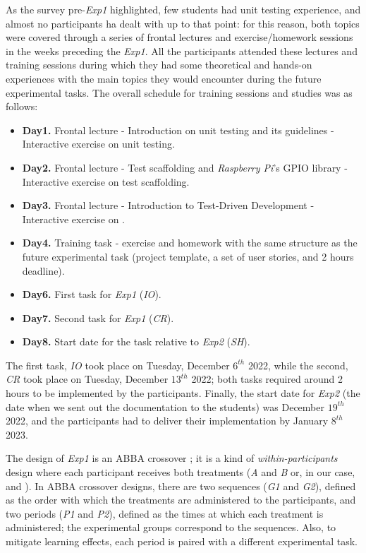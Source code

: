 As the survey pre-\textit{Exp1} highlighted, few students had unit testing experience, and almost no participants ha dealt with \tdd up to that point: for this reason, both topics were covered through a series of frontal lectures and exercise/homework sessions in the weeks preceding the \textit{Exp1}. All the participants attended these lectures and training sessions during which they had some theoretical and hands-on experiences with the main topics they would encounter during the future experimental tasks. The overall schedule for training sessions and studies was as follows:
\begin{itemize}
    \item \textbf{Day1.} Frontal lecture - Introduction on unit testing and its guidelines - Interactive exercise on unit testing.
    \item \textbf{Day2.} Frontal lecture - Test scaffolding and \textit{Raspberry Pi}'s GPIO library - Interactive exercise on test scaffolding.
    \item \textbf{Day3.} Frontal lecture - Introduction to Test-Driven Development - Interactive exercise on \tdd.
    \item \textbf{Day4.} Training task - \tdd exercise and homework with the same structure as the future experimental task (\ie project template, a set of user stories, and 2 hours deadline).
    \item \textbf{Day6.} First task for \textit{Exp1} (\textit{IO}).
    \item \textbf{Day7.} Second task for \textit{Exp1} (\textit{CR}).
    \item \textbf{Day8.} Start date for the task relative to \textit{Exp2} (\textit{SH}).
\end{itemize}


The first task, \textit{IO} took place on Tuesday, December $6^{th}$ 2022, while the second, \textit{CR} took place on Tuesday, December $13^{th}$ 2022; both tasks required around 2 hours to be implemented by the participants. Finally, the start date for \textit{Exp2} (\ie the date when we sent out the documentation to the students) was December $19^{th}$ 2022, and the participants had to deliver their implementation by January $8^{th}$ 2023.

The design of \textit{Exp1} is an ABBA crossover \cite{DBLP:journals/tse/VegasAJ16}; it is a kind of \textit{within-participants} design where each participant receives both treatments (\ie \textit{A} and \textit{B} or, in our case, \tdd and \notdd). In ABBA crossover designs, there are two sequences (\ie \textit{G1} and \textit{G2}), defined as the order with which the treatments are administered to the participants, and two periods (\ie \textit{P1} and \textit{P2}), defined as the times at which each treatment is administered; the experimental groups correspond to the sequences. Also, to mitigate learning effects, each period is paired with a
different experimental task.

